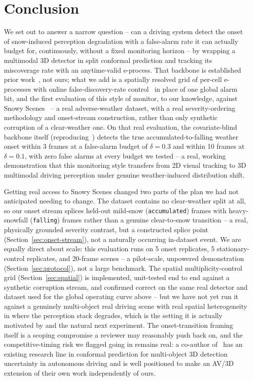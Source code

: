 \section{Conclusion}
\label{sec:conclusion}

We set out to answer a narrow question -- can a driving system detect the onset of snow-induced perception degradation with a false-alarm rate it can actually budget for, continuously, without a fixed monitoring horizon -- by wrapping a multimodal 3D detector in split conformal prediction and tracking its miscoverage rate with an anytime-valid e-process. That backbone is established prior work~\cite{MonroyMunoz2026WACV,WaudbySmithRamdas2024JRSSB}, not ours; what we add is a spatially resolved grid of per-cell e-processes with online false-discovery-rate control~\cite{WangRamdas2022JRSSB} in place of one global alarm bit, and the first evaluation of this style of monitor, to our knowledge, against Snowy Scenes~\cite{SnowyScenes2026} -- a real adverse-weather dataset, with a real severity-ordering methodology and onset-stream construction, rather than only synthetic corruption of a clear-weather one. On that real evaluation, the covariate-blind backbone itself (reproducing~\cite{MonroyMunoz2026WACV}) detects the true accumulated-to-falling weather onset within 3 frames at a false-alarm budget of $\delta=0.3$ and within 10 frames at $\delta=0.1$, with zero false alarms at every budget we tested -- a real, working demonstration that this monitoring style transfers from 2D visual tracking to 3D multimodal driving perception under genuine weather-induced distribution shift.

Getting real access to Snowy Scenes changed two parts of the plan we had not anticipated needing to change. The dataset contains no clear-weather split at all, so our onset stream splices held-out mild-snow (\texttt{accumulated}) frames with heavy-snowfall (\texttt{falling}) frames rather than a genuine clear-to-snow transition -- a real, physically grounded severity contrast, but a constructed splice point (Section~\ref{sec:onset-stream}), not a naturally occurring in-dataset event. We are equally direct about scale: this evaluation runs on 5 onset replicates, 5 stationary-control replicates, and 20-frame scenes -- a pilot-scale, unpowered demonstration (Section~\ref{sec:protocol}), not a large benchmark. The spatial multiplicity-control grid (Section~\ref{sec:spatial}) is implemented, unit-tested end to end against a synthetic corruption stream, and confirmed correct on the same real detector and dataset used for the global operating curve above -- but we have not yet run it against a genuinely multi-object real driving scene with real spatial heterogeneity in where the perception stack degrades, which is the setting it is actually motivated by and the natural next experiment. The onset-transition framing itself is a scoping compromise a reviewer may reasonably push back on, and the competitive-timing risk we flagged going in remains real: a co-author of~\cite{MonroyMunoz2026WACV} has an existing research line in conformal prediction for multi-object 3D detection uncertainty in autonomous driving and is well positioned to make an AV/3D extension of their own work independently of ours.

